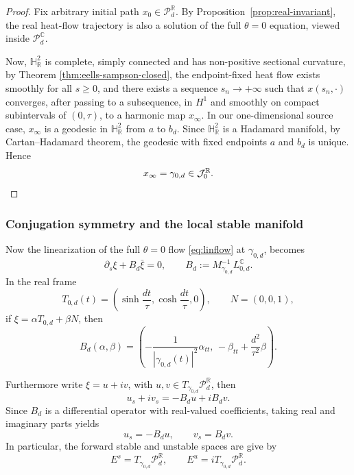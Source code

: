 \documentclass[11pt]{amsart}
\theoremstyle{plain}
\theoremstyle{definition}
\newcommand{\R}{\mathbb{R}}
\newcommand{\C}{\mathbb{C}}
\newcommand{\PP}{\mathcal{P}}
\newcommand{\HH}{\mathbb{H}}
\begin{document}
\begin{proof}
Fix arbitrary initial path $x_0\in \PP^{\R}_d$. 
By Proposition~\ref{prop:real-invariant}, the real heat-flow trajectory is also a solution of the full $\theta=0$ equation, viewed inside $\PP^{\C}_d$.

Now, $\HH^2_{\R}$ is complete, simply connected and has non-positive
sectional curvature, by Theorem \ref{thm:eells-sampson-closed}, the endpoint-fixed heat flow exists smoothly for all $s\ge0$, and there exists a sequence $s_n\to+\infty$ such that $x(s_n,\cdot)$ converges,
after passing to a subsequence, in $H^1$ and smoothly on compact subintervals
of $(0,\tau)$, to a harmonic map $x_\infty$.  In our one-dimensional
source case, 
$x_\infty$ is a geodesic in $\HH^2_{\R}$ from $a$ to $b_d$. Since $\HH^2_{\R}$ is a Hadamard manifold, by Cartan--Hadamard theorem, the geodesic with fixed
endpoints $a$ and $b_d$ is unique. Hence
\[
 x_\infty=\gamma_{0,d}\in \mathcal{J}^{\R}_0.\qedhere
\]
\end{proof}



\subsubsection{Conjugation symmetry and the local stable manifold}




Now the linearization of the full $\theta=0$ flow  \eqref{eq:linflow} at $\gamma_{0,d}$, becomes
\[\partial_s\xi+B_d\bar{\xi}=0,\qquad B_d:=M_{\gamma_{0,d}}^{-1}L_{0,d}^{\C}.\]
In the real frame
\[T_{0,d}(t)=\left(\sinh\frac{dt}{\tau},\cosh\frac{dt}{\tau},0\right),
\qquad
N=(0,0,1),
\]
if $\xi=\alpha T_{0,d}+\beta N$, then
\[
B_d(\alpha,\beta)
=
\left(
-\frac{1}{|\gamma_{0,d}(t)|^2}\alpha_{tt},
\,
-\beta_{tt}+\frac{d^2}{\tau^2}\beta
\right).
\]


Furthermore write $\xi=u+iv$, with $u,v\in T_{\gamma_{0,d}}\PP_d^{\R}$, then
\[u_s+i v_s=-B_d u+iB_dv.\]
Since $B_d$ is a differential operator with real-valued coefficients, taking real and imaginary parts yields
\begin{equation}\label{eq:uvlineaer}
u_s=-B_
du,\qquad v_s=B_dv.
\end{equation}
In particular, the forward stable and unstable spaces are give by
\[E^s=T_{\gamma_{0,d}}\PP_d^{\R}, \qquad E^u=iT_{\gamma_{0,d}}\PP_d^{\R}.\]
\end{document}
